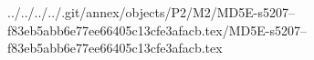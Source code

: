 ../../../../.git/annex/objects/P2/M2/MD5E-s5207--f83eb5abb6e77ee66405c13cfe3afacb.tex/MD5E-s5207--f83eb5abb6e77ee66405c13cfe3afacb.tex